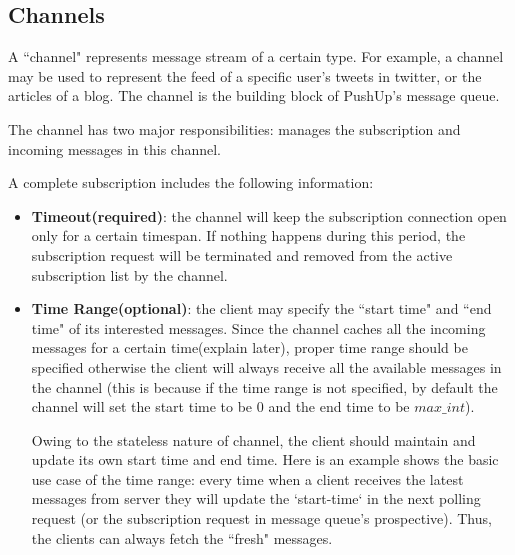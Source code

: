 \subsection{Channels\\}

A ``channel" represents message stream of a certain type. For example, a
channel may be used to represent the feed of a specific user's tweets in
twitter, or the articles of a blog. The channel is the building block of 
PushUp's message queue.

The channel has two major responsibilities: manages the subscription and
incoming messages in this channel.

A complete subscription includes the following information:

\begin{itemize}
    \item {\bf Timeout(required)}: the channel will keep the subscription 
        connection open only for a certain timespan. If nothing happens 
        during this period, the
        subscription request will be terminated and removed from the active 
        subscription list by the channel.
    \item {\bf Time Range(optional)}: the client may specify the ``start time"
            and ``end time" of its interested messages. Since the channel 
            caches all the incoming messages for a certain time(explain later), 
            proper time range should be specified otherwise the client will 
            always receive all the available messages in the channel (this is
            because if the time range is not specified, by default the channel
            will set the start time to be $0$ and the end time to be 
            $max\_int$).

            Owing to the stateless nature of channel, the client should 
            maintain and update its own start time and end time. 
            Here is an example shows the basic use case of the time range:
            every time when a client receives the latest messages from server
            they will update the `start-time` in the next polling request (or 
            the subscription request in message queue's prospective). Thus, the
            clients can always fetch the ``fresh" messages.
\end{itemize}

